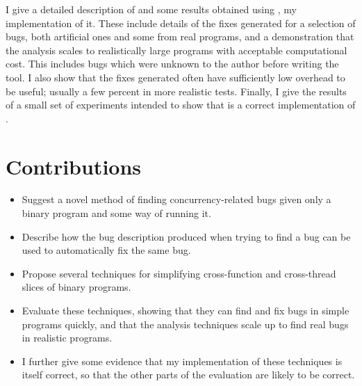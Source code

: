 
I give a detailed description of \technique{} and some results
obtained using \implementation, my implementation of it.  These
include details of the fixes generated for a selection of bugs, both
artificial ones and some from real programs, and a demonstration that
the analysis scales to realistically large programs with acceptable
computational cost.  This includes bugs which were unknown to the
author before writing the tool.  I also show that the fixes
generated often have sufficiently low overhead to be useful; usually a
few percent in more realistic tests.  Finally, I give the results of a
small set of experiments intended to show that \implementation{} is a
correct implementation of \technique{}.


\section{Contributions}

\begin{itemize}
\item
  Suggest a novel method of finding concurrency-related bugs given
  only a binary program and some way of running it.
\item
  Describe how the bug description produced when trying to find a bug
  can be used to automatically fix the same bug.
\item
  Propose several techniques for simplifying cross-function and
  cross-thread slices of binary programs.
\item
  Evaluate these techniques, showing that they can find and fix bugs
  in simple programs quickly, and that the analysis techniques
   scale up to find real bugs in realistic
  programs.
\item
  I further give some evidence that my implementation of these
  techniques is itself correct, so that the other parts of the
  evaluation are likely to be correct.
\end{itemize}


